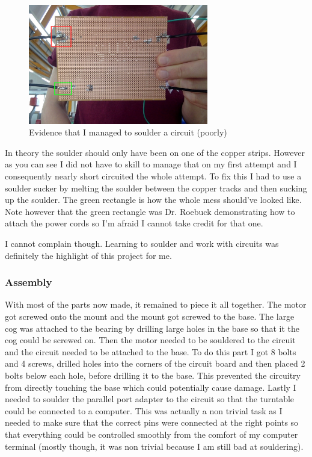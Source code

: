 \documentclass[a4paper]{article}
\begin{document}
\begin{figure}[H]
  \centering
    \includegraphics[width=0.7\textwidth]{figures/circuit_1_red.jpg}
    \caption{Evidence that I managed to soulder a circuit (poorly)}
  \label{fig:f2}
\end{figure}

In theory the soulder should only have been on one of the copper strips. 
However as you can see I did not have to skill to manage that on my first attempt and I consequently nearly short circuited the whole attempt.
To fix this I had to use a soulder sucker by melting the soulder between the copper tracks and then sucking up the soulder.
The green rectangle is how the whole mess should've looked like.
Note however that the green rectangle was Dr. Roebuck demonstrating how to attach the power cords so I'm afraid I cannot take credit for that one.

I cannot complain though. Learning to soulder and work with circuits was definitely the highlight of this project for me.

\subsubsection{Assembly}
With most of the parts now made, it remained to piece it all together.
The motor got screwed onto the mount and the mount got screwed to the base.
The large cog was attached to the bearing by drilling large holes in the base so that it the cog could be screwed on.
Then the motor needed to be souldered to the circuit and the circuit needed to be attached to the base.
To do this part I got 8 bolts and 4 screws, drilled holes into the corners of the circuit board and then placed 2 bolts below each hole, before drilling it to the base.
This prevented the circuitry from directly touching the base which could potentially cause damage.
Lastly I needed to soulder the parallel port adapter to the circuit so that the turntable could be connected to a computer.
This was actually a non trivial task as I needed to make sure that the correct pins were connected at the right points so that everything could be controlled smoothly from the comfort of my computer terminal (mostly though, it was non trivial because I am still bad at souldering).
\end{document}

